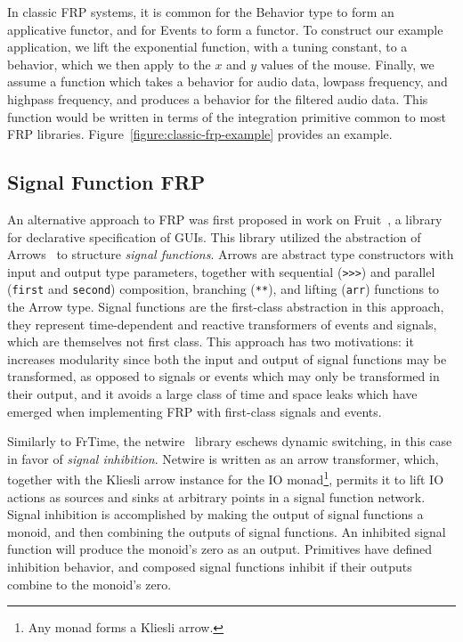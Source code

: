 In classic FRP systems, it is common for the Behavior type to form an applicative functor, and for Events to form a functor. To construct our example application,
we lift the exponential function, with a tuning constant, to a behavior, which we then apply to the $x$ and $y$ values of the mouse. Finally, we assume
a function which takes a behavior for audio data, lowpass frequency, and highpass frequency, and produces a behavior for the filtered audio data. This
function would be written in terms of the integration primitive common to most FRP libraries. Figure~\ref{figure:classic-frp-example} provides an example.

\subsection{Signal Function FRP}
\label{subsection:signal_function_frp}

An alternative approach to FRP was first proposed in work on Fruit~\cite{Courtney2001-1}, a library for declarative specification of GUIs. This library
utilized the abstraction of Arrows~\cite{Hughes2000} to structure {\em signal functions}. Arrows are abstract type constructors with input and output type
parameters, together with sequential ({\tt >>>}) and parallel ({\tt first} and {\tt second}) composition, branching ({\tt ***}), and lifting ({\tt arr}) functions
to the Arrow type. Signal functions are the first-class abstraction in this approach, they represent time-dependent and reactive transformers of events and signals, 
which are themselves not first class. This approach has two motivations: it increases modularity since both the input and output of signal functions may be transformed,
as opposed to signals or events which may only be transformed in their output, and it avoids a large class of time and space leaks which have emerged when
implementing FRP with first-class signals and events.

Similarly to FrTime, the netwire~\cite{Soylemez} library eschews dynamic switching, in this case in favor of {\em signal inhibition}. Netwire is written as an arrow
transformer, which, together with the Kliesli arrow instance for the IO monad\footnote{Any monad forms a Kliesli arrow.}, permits it to lift IO actions as sources and
sinks at arbitrary points in a signal function network. Signal inhibition is accomplished by making the output of signal functions a monoid, and then combining the
outputs of signal functions. An inhibited signal function will produce the monoid's zero as an output. Primitives have defined inhibition behavior, and composed signal
functions inhibit if their outputs combine to the monoid's zero.

